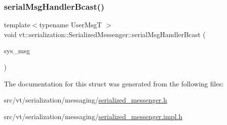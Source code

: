 \mbox{\label{structvt_1_1serialization_1_1_serialized_messenger_adc342b3e5a4a536182f6045c5fe485b7}} 
\subsubsection{\texorpdfstring{serial\+Msg\+Handler\+Bcast()}{serialMsgHandlerBcast()}}
{\footnotesize\ttfamily template$<$typename User\+MsgT $>$ \\
void vt\+::serialization\+::\+Serialized\+Messenger\+::serial\+Msg\+Handler\+Bcast (\begin{DoxyParamCaption}\item[{\hyperlink{structvt_1_1serialization_1_1_serialized_messenger_a279027d1664b42cf7f288dc3fc9c3014}{Serial\+Wrapper\+Msg\+Type}$<$ User\+MsgT $>$ $\ast$}]{sys\+\_\+msg }\end{DoxyParamCaption})\hspace{0.3cm}{\ttfamily [static]}}



The documentation for this struct was generated from the following files\+:\begin{DoxyCompactItemize}
\item 
src/vt/serialization/messaging/\hyperlink{serialized__messenger_8h}{serialized\+\_\+messenger.\+h}\item 
src/vt/serialization/messaging/\hyperlink{serialized__messenger_8impl_8h}{serialized\+\_\+messenger.\+impl.\+h}\end{DoxyCompactItemize}
